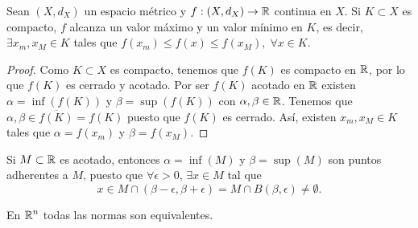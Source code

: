 \begin{colorary}
Sean $\displaystyle \left(X,d _{X}\right) $ un espacio métrico y $\displaystyle f : \left(X, d _{X}\right) \to \mathbb{R} $ continua en $\displaystyle X $. Si $\displaystyle K \subset X $ es compacto, $\displaystyle f $ alcanza un valor máximo y un valor mínimo en $\displaystyle K $, es decir, $\displaystyle \exists x_{m}, x_{M} \in K $ tales que $\displaystyle f\left(x_{m}\right) \leq f\left(x\right) \leq f\left(x_{M}\right), \; \forall x \in K $.
\end{colorary}
\begin{proof}
Como $\displaystyle K \subset X $ es compacto, tenemos que $\displaystyle f\left(K\right) $ es compacto en $\displaystyle \mathbb{R} $, por lo que $\displaystyle f\left(K\right) $ es cerrado y acotado. Por ser $\displaystyle f\left(K\right) $ acotado en $\displaystyle \mathbb{R} $ existen $\displaystyle \alpha = \inf \left(f\left(K\right)\right) $ y $\displaystyle \beta = \sup\left(f\left(K\right)\right) $ con $\displaystyle \alpha, \beta \in \mathbb{R} $. Tenemos que $\displaystyle \alpha, \beta \in \overline{f\left(K\right)} = f\left(K\right) $ puesto que $\displaystyle f\left(K\right) $ es cerrado. Así, existen $\displaystyle x_{m}, x_{M} \in K $ tales que $\displaystyle \alpha = f\left(x_{m}\right) $ y $\displaystyle \beta = f\left(x_{M}\right) $.
\end{proof}
\begin{observation}
Si $\displaystyle M \subset \mathbb{R} $ es acotado, entonces $\displaystyle \alpha = \inf\left(M\right) $ y $\displaystyle \beta = \sup\left(M\right) $ son puntos adherentes a $\displaystyle M $, puesto que $\displaystyle \forall \epsilon > 0 $, $\displaystyle \exists x\in M $ tal que 
\[x \in M \cap \left(\beta - \epsilon, \beta + \epsilon \right) = M \cap B\left(\beta, \epsilon \right) \neq \emptyset .\]
\end{observation}
\begin{theorem}
En $\displaystyle \mathbb{R}^{n} $ todas las normas son equivalentes.
\end{theorem}
